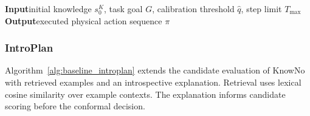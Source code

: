 \begin{algorithm}[H]
\caption{KnowNo}
\label{alg:baseline_knowno}
\textbf{Input}\quad initial knowledge $s_0^{K}$, task goal $G$, calibration threshold $\hat q$, step limit $T_{\max}$\\
\textbf{Output}\quad executed physical action sequence $\pi$
\BlankLine
{}
\end{algorithm}

\subsubsection{IntroPlan}
Algorithm~\ref{alg:baseline_introplan} extends the candidate evaluation of KnowNo with retrieved examples and an introspective explanation. Retrieval uses lexical cosine similarity over example contexts. The explanation informs candidate scoring before the conformal decision.

